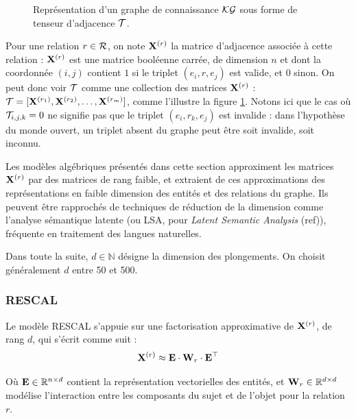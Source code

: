 \begin{figure}
    \centering
    
    \caption[Représentation de graphe sous forme de tenseur d'adjacence]{Représentation d'un graphe de connaissance $\KG$ sous forme de tenseur d'adjacence $\cal{T}$.}
    \label{fig:kge-algebric-overview}
\end{figure}

Pour une relation $r \in \Rel$, on note $\bf{X}^{(r)}$ la matrice d'adjacence associée à cette relation : $\bf{X}^{(r)}$ est une matrice booléenne carrée, de dimension $n$ et dont la coordonnée $(i, j)$ contient $1$ si le triplet $(e_i, r, e_j)$ est valide, et $0$ sinon. On peut donc voir $\cal{T}$ comme une collection des matrices $\bf{X}^{(r)}$ : $\cal{T} = [\bf{X}^{(r_1)}, \bf{X}^{(r_2)}, \ldots, \bf{X}^{(r_m)}]$, comme l'illustre la figure  \ref{fig:kge-algebric-overview}. Notons ici que le cas où $\cal{T}_{i, j, k} = 0$ ne signifie pas que le triplet $(e_i, r_k, e_j)$ est invalide : dans l'hypothèse du monde ouvert, un triplet absent du graphe peut être soit invalide, soit inconnu.

Les modèles algébriques présentés dans cette section approximent les matrices $\bf{X}^{(r)}$ par des matrices de rang faible, et extraient de ces approximations des représentations en faible dimension des entités et des relations du graphe. Ils peuvent être rapprochés de techniques de réduction de la dimension comme l'analyse sémantique latente (ou LSA, pour \textit{Latent Semantic Analysis} (ref)), fréquente en traitement des langues naturelles.

Dans toute la suite, $d \in \mathbb{N}$ désigne la dimension des plongements. On choisit généralement $d$ entre 50 et 500.

\subsubsection{RESCAL}

Le modèle RESCAL \cite{rescal} s'appuie sur une factorisation approximative de $\bf{X}^{(r)}$, de rang $d$, qui s'écrit comme suit  :
\begin{equation}
    \bf{X}^{(r)} \approx \bf{E} \cdot \bf{W}_r \cdot \bf{E}^\top
    \label{eq:kge-rescal-factorization}
\end{equation}

Où $\bf{E} \in \R^{n \times d}$ contient la représentation vectorielles des entités, et $\bf{W}_r \in \R^{d \times d}$ modélise l'interaction entre les composants du sujet et de l'objet pour la relation $r$.

